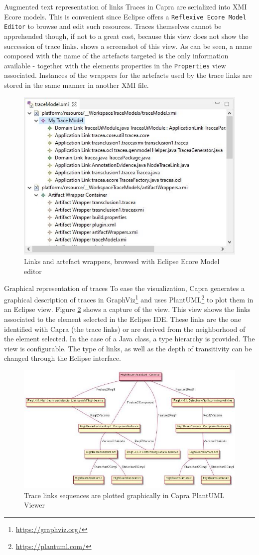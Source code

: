 \begin{descriptioncompact}
    \item[Augmented text representation of links] 
Traces in Capra are serialized into XMI Ecore models. This is convenient since Eclipse offers a \texttt{Reflexive Ecore Model Editor} to browse and edit such resources. Traces themselves cannot be apprehended though, if not to a great cost, because this view does not show the succession of trace links.  shows a screenshot of this view. As can be seen, a name composed with the name of the artefacts targeted is the only information available - together with the elements properties in the \texttt{Properties} view associated. 
Instances of the wrappers for the artefacts used by the trace links are stored in the same manner in another XMI file.
\begin{figure}[h] 
	\centering
	\includegraphics[width=.65\linewidth]{images/XMIEditor.jpg}
	\caption{Links and artefact wrappers, browsed with Eclipse Ecore Model editor}
	\label{fig:xmieditor}
\end{figure}

    \item[Graphical representation of traces] %
To ease the visualization, Capra generates a graphical description of traces in GraphViz\footnote{\url{https://graphviz.org/}} and uses PlantUML\footnote{\url{https://plantuml.com/}} to plot them in an Eclipse view. Figure \ref{fig:plantuml} shows a capture of the view.
This view shows the links associated to the element selected in the Eclipse IDE. These links are the one {identified} with Capra (the trace links) or are derived from the neighborhood of the element selected. In the case of a Java class, a type hierarchy is provided.
The view is configurable. The type of links, as well as {the depth of transitivity} can be changed through the Eclipse interface.  
\begin{figure}[h] 
	\centering
	\includegraphics[width=.60\linewidth]{images/plantuml-viewer.jpg}
	\caption{Trace links sequences are plotted graphically in Capra PlantUML Viewer}
	\label{fig:plantuml}
\end{figure}


\end{descriptioncompact}
